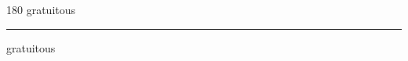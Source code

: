 
\begin{frame}
\begin{center}
\begin{turn}{180}
{\fontsize{2.5cm}{1em}\selectfont gratuitous}
\end{turn}
\vspace{1em}\par  
\hrule
\vspace{1em}\par  
{\fontsize{2.5cm}{1em}\selectfont gratuitous}
\end{center}
\end{frame}
